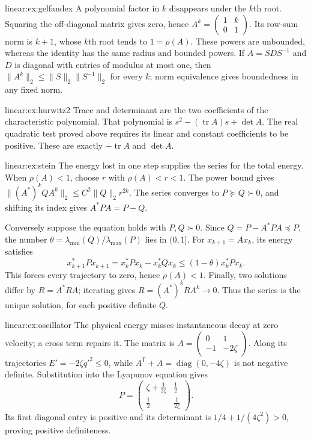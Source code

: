 \begin{solution}{linear:ex:gelfandex}
\idea A polynomial factor in $k$ disappears under the $k$th root.
\writeup Squaring the off-diagonal matrix gives zero, hence $A^k=\left(\begin{smallmatrix}1&k\\0&1\end{smallmatrix}\right)$. Its row-sum norm is $k+1$, whose $k$th root tends to $1=\rho(A)$. These powers are unbounded, whereas the identity has the same radius and bounded powers. If $A=SDS^{-1}$ and $D$ is diagonal with entries of modulus at most one, then $\|A^k\|_2\le\|S\|_2\|S^{-1}\|_2$ for every $k$; norm equivalence gives boundedness in any fixed norm.
\end{solution}
\begin{solution}{linear:ex:hurwitz2}
\idea Trace and determinant are the two coefficients of the characteristic polynomial.
\writeup That polynomial is $s^2-(\operatorname{tr}A)s+\det A$. The real quadratic test proved above requires its linear and constant coefficients to be positive. These are exactly $-\operatorname{tr}A$ and $\det A$.
\end{solution}
\begin{solution}{linear:ex:stein}
\idea The energy lost in one step supplies the series for the total energy.
\writeup When $\rho(A)<1$, choose $r$ with $\rho(A)<r<1$. The power bound gives $\|(A^*)^kQA^k\|_2\le C^2\|Q\|_2r^{2k}$. The series converges to $P\succeq Q\succ0$, and shifting its index gives $A^*PA=P-Q$.

Conversely suppose the equation holds with $P,Q\succ0$. Since $Q=P-A^*PA\preceq P$, the number $\theta=\lambda_{\min}(Q)/\lambda_{\max}(P)$ lies in $(0,1]$. For $x_{k+1}=Ax_k$, its energy satisfies
\[x_{k+1}^*Px_{k+1}=x_k^*Px_k-x_k^*Qx_k\le(1-\theta)x_k^*Px_k.
\]
This forces every trajectory to zero, hence $\rho(A)<1$. Finally, two solutions differ by $R=A^*RA$; iterating gives $R=(A^*)^kRA^k\to0$. Thus the series is the unique solution, for each positive definite $Q$.
\end{solution}
\begin{solution}{linear:ex:oscillator}
\idea The physical energy misses instantaneous decay at zero velocity; a cross term repairs it.
\writeup The matrix is $A=\left(\begin{smallmatrix}0&1\\-1&-2\zeta\end{smallmatrix}\right)$. Along its trajectories $E'=-2\zeta q'^2\le0$, while $A^{\mathsf T}+A=\operatorname{diag}(0,-4\zeta)$ is not negative definite. Substitution into the Lyapunov equation gives
\[P=\begin{pmatrix}\zeta+\frac1{2\zeta}&\frac12\\[2pt]\frac12&\frac1{2\zeta}\end{pmatrix}.
\]
Its first diagonal entry is positive and its determinant is $1/4+1/(4\zeta^2)>0$, proving positive definiteness.
\end{solution}
